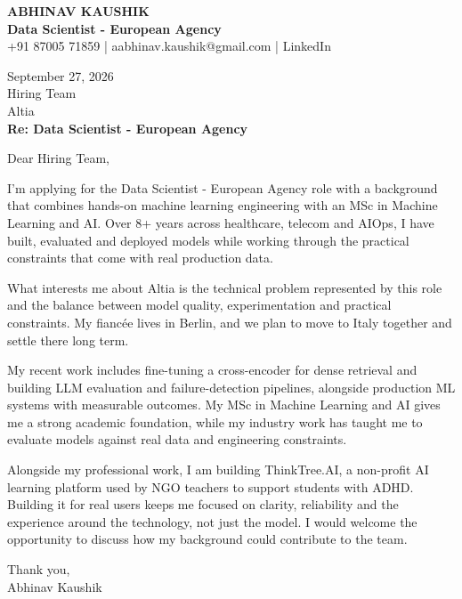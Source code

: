 \documentclass[10pt,a4paper]{article}
\begin{document}
\begin{center}
{\Large\bfseries ABHINAV KAUSHIK}\\[2pt]
{\bfseries Data Scientist - European Agency}\\[2pt]
+91 87005 71859 \quad | \quad aabhinav.kaushik@gmail.com \quad | \quad LinkedIn
\end{center}
\vspace{8pt}
September 27, 2026\\[6pt]
Hiring Team\\
Altia\\[4pt]
\textbf{Re: Data Scientist - European Agency}

Dear Hiring Team,

I’m applying for the Data Scientist - European Agency role with a background that combines hands-on machine learning engineering with an MSc in Machine Learning and AI. Over 8+ years across healthcare, telecom and AIOps, I have built, evaluated and deployed models while working through the practical constraints that come with real production data.

What interests me about Altia is the technical problem represented by this role and the balance between model quality, experimentation and practical constraints. My fiancée lives in Berlin, and we plan to move to Italy together and settle there long term.

My recent work includes fine-tuning a cross-encoder for dense retrieval and building LLM evaluation and failure-detection pipelines, alongside production ML systems with measurable outcomes. My MSc in Machine Learning and AI gives me a strong academic foundation, while my industry work has taught me to evaluate models against real data and engineering constraints.

Alongside my professional work, I am building ThinkTree.AI, a non-profit AI learning platform used by NGO teachers to support students with ADHD. Building it for real users keeps me focused on clarity, reliability and the experience around the technology, not just the model. I would welcome the opportunity to discuss how my background could contribute to the team.

Thank you,\\
Abhinav Kaushik
\end{document}
